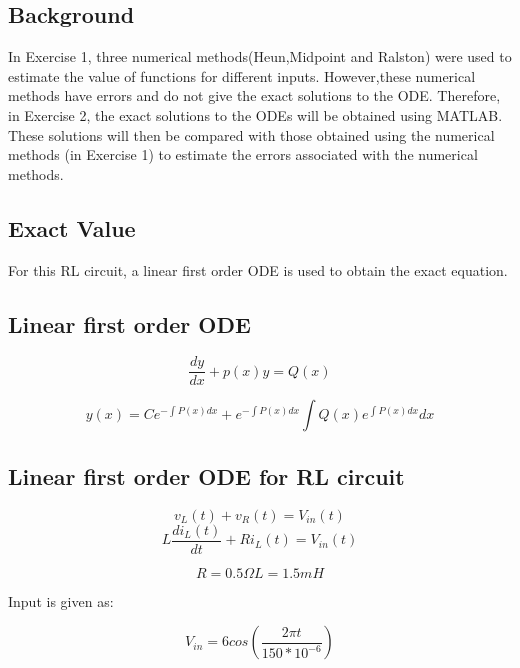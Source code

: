 \documentclass[11pt,a4paper]{article}
\begin{document}
\subsection{Background}

\vspace{-2mm}In Exercise 1, three numerical methods(Heun,Midpoint and Ralston) were used to estimate the value of functions for different inputs. However,these numerical methods have errors and do not give the exact solutions to the ODE. Therefore, in Exercise 2, the exact solutions to the ODEs will be obtained using MATLAB. These solutions will then be compared with those obtained using the numerical methods (in Exercise 1) to estimate the errors associated with the numerical methods.

\subsection{Exact Value}

For this RL circuit, a linear first order ODE is used to obtain the exact equation.

\subsection{Linear first order ODE}

\begin{equation}
\frac{dy}{dx}+p(x)y=Q(x)
\end{equation}

\begin{equation}
y(x)=Ce^{-\int{P(x)dx}}+e^{-\int{P(x)dx}}\int{Q(x)e^{\int{P(x)dx}}dx}
\end{equation}

\subsection{Linear first order ODE for RL circuit}

\begin{equation}
v_L(t)+v_R(t)=V_{in}(t)
\end{equation}
\begin{equation}
L\frac{di_L(t)}{dt}+Ri_L(t)=V_{in}(t)
\end{equation}

\begin{equation}
R=0.5\Omega
L=1.5mH
\end{equation}

Input is given as:

\begin{equation}
V_{in}=6cos(\frac{2{\pi}t}{150*{10^{-6}}})
\end{equation}
\end{document}
